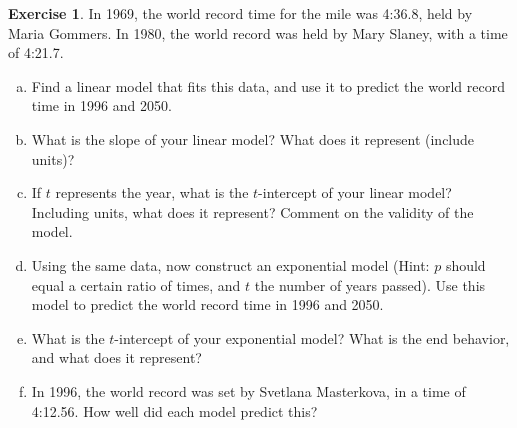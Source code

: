 \documentclass[11pt,reqno,final]{amsart}
\numberwithin{equation}{section}
\numberwithin{figure}{section}
\theoremstyle{definition} %
\newtheorem{exercise}[question]{Exercise}
\begin{document}
\begin{exercise}
        In 1969, the world record time for the mile was 4:36.8, held by Maria Gommers.
        In 1980, the world record was held by Mary Slaney, with a time of 4:21.7.
        \begin{enumerate}[(a)]
        \item Find a linear model that fits this data, and use it to predict the world record time in 1996 and 2050.
                \vfill
                \vfill
        \item What is the slope of your linear model? What does it represent (include units)?
                \vfill
        \item If $t$ represents the year, what is the $t$-intercept of your linear model?
                Including units, what does it represent?
                Comment on the validity of the model.
                \vfill
        \item Using the same data, now construct an exponential model
                (Hint: $p$ should equal a certain ratio of times, and $t$ the number of years passed).
                Use this model to predict the world record time in 1996 and 2050.
                \vfill
                \vfill
        \item What is the $t$-intercept of your exponential model? What is the end behavior, and what does it represent?
                \vfill
        \item In 1996, the world record was set by Svetlana Masterkova, in a time of 4:12.56.
                How well did each model predict this?
                \vfill
        \end{enumerate}
\end{exercise}
\end{document}
